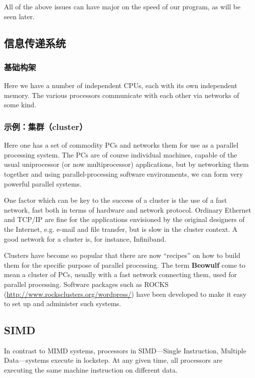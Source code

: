All of the above issues can have major on the speed of our program, as
will be seen later.

\subsection{信息传递系统}

\subsubsection{基础构架}

Here we have a number of independent CPUs, each with its own independent
memory.  The various processors communicate with each other via networks
of some kind.

\subsubsection{示例：集群（cluster）}

Here one has a set of commodity PCs and networks them for use as a
parallel processing system. The PCs are of course individual machines,
capable of the usual uniprocessor (or now multiprocessor) applications,
but by networking them together and using parallel-processing software
environments, we can form very powerful parallel systems.

One factor which can be key to the success of a cluster is the use of a fast
network, fast both in terms of hardware and network protocol.  Ordinary
Ethernet and TCP/IP are fine for the applications envisioned by the
original designers of the Internet, e.g. e-mail and file transfer, but
is slow in the cluster context.  A good network for a cluster is, for instance,
Infiniband.

Clusters have become so popular that there are now ``recipes'' on how to
build them for the specific purpose of parallel processing.  The term
{\bf Beowulf} come to mean a cluster of PCs, usually with a fast network
connecting them, used for parallel processing.  Software packages such
as ROCKS (\url{http://www.rocksclusters.org/wordpress/}) have been
developed to make it easy to set up and administer such systems.

\subsection{SIMD}

In contrast to MIMD systems, processors in SIMD---Single Instruction,
Multiple Data---systems execute in lockstep.  At any given time, all
processors are executing the same machine instruction on different data.

